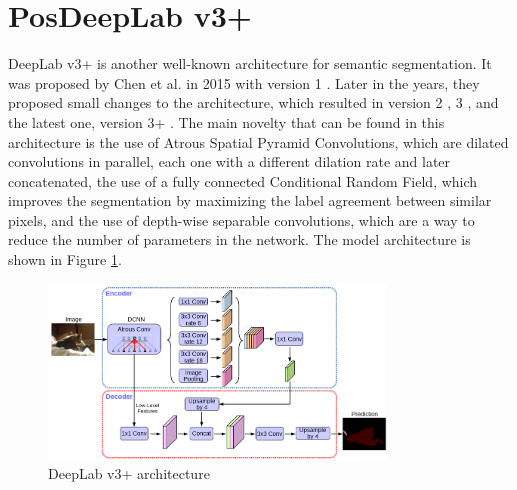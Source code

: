 \section{PosDeepLab v3+}
DeepLab v3+ is another well-known architecture for semantic segmentation. It was
proposed by Chen et al. in 2015 with version 1 \cite{chen2014deeplab1}. Later in
the years, they proposed small changes to the architecture, which resulted in
version 2 \cite{chen2017deeplab2}, 3 \cite{chen2017deeplab3}, and the latest
one, version 3+ \cite{chen2018deeplab3p}. The main novelty that can be found in
this architecture is the use of Atrous Spatial Pyramid Convolutions, which are
dilated convolutions in parallel, each one with a different dilation rate and
later concatenated, the use of a fully connected Conditional Random Field, which
improves the segmentation by maximizing the label agreement between similar
pixels, and the use of depth-wise separable convolutions, which are a way to
reduce the number of parameters in the network. The model architecture is shown
in Figure \ref{fig:deeplabv3+}.
\begin{figure}[h]
  \centering
  \includegraphics[width=0.8\textwidth]{Images/DeepLabv3+.png}
  \caption{DeepLab v3+ architecture}
  \label{fig:deeplabv3+}
\end{figure}

